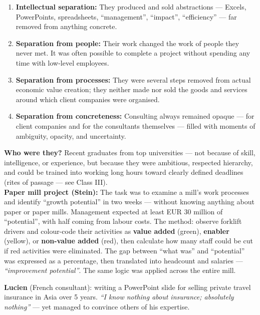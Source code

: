 \documentclass[a4paper,12pt]{article}
\begin{document}
\begin{enumerate}
	\item \textbf{Intellectual separation:} They produced and sold abstractions — Excels, PowerPoints, spreadsheets, ``management'', ``impact'', ``efficiency'' — far removed from anything concrete.
	\item \textbf{Separation from people:} Their work changed the work of people they never met. It was often possible to complete a project without spending any time with low-level employees.
	\item \textbf{Separation from processes:} They were several steps removed from actual economic value creation; they neither made nor sold the goods and services around which client companies were organised.
	\item \textbf{Separation from concreteness:} Consulting always remained opaque — for client companies and for the consultants themselves — filled with moments of ambiguity, opacity, and uncertainty.
\end{enumerate}

\noindent \textbf{Who were they?} Recent graduates from top universities — not because of skill, intelligence, or experience, but because they were ambitious, respected hierarchy, and could be trained into working long hours toward clearly defined deadlines (rites of passage — see Class III). \\

\noindent \textbf{Paper mill project (Stein):} The task was to examine a mill's work processes and identify ``growth potential'' in two weeks --- without knowing anything about paper or paper mills. Management expected at least EUR 30 million of ``potential'', with half coming from labour costs. The method: observe forklift drivers and colour-code their activities as \textbf{value added} (green), \textbf{enabler} (yellow), or \textbf{non-value added} (red), then calculate how many staff could be cut if red activities were eliminated. The gap between ``what was'' and ``potential'' was expressed as a percentage, then translated into headcount and salaries --- \emph{``improvement potential''}. The same logic was applied across the entire mill.

\noindent \textbf{Lucien} (French consultant): writing a PowerPoint slide for selling private travel insurance in Asia over 5 years. \emph{``I know nothing about insurance; absolutely nothing''} — yet managed to convince others of his expertise. \\
\end{document}
